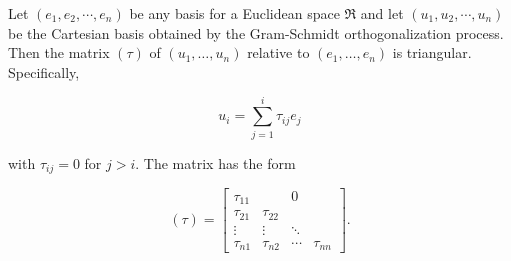 Let $(e_1, e_2, \cdots, e_n)$ be any basis for a Euclidean space $\Re$ and let $(u_1, u_2, \cdots, u_n)$ be the Cartesian basis obtained by the Gram-Schmidt orthogonalization process. Then the matrix $(\tau)$ of $(u_1, \ldots, u_n)$ relative to $(e_1, \ldots, e_n)$ is triangular. Specifically,

$$u_i = \sum_{j=1}^{i} \tau_{ij} e_j$$

with $\tau_{ij} = 0$ for $j > i$. The matrix has the form

$$(\tau) = \begin{bmatrix}
\tau_{11} & & 0 \\
\tau_{21} & \tau_{22} & \\
\vdots & \vdots & \ddots \\
\tau_{n1} & \tau_{n2} & \cdots & \tau_{nn}
\end{bmatrix}.$$
